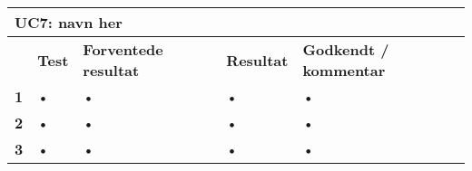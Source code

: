 
\begin{longtable}{|p{5mm}|p{40mm}|p{40mm}|p{20mm}|p{25mm}|}
\hline 
\multicolumn{5}{|l|}{\textbf{UC7: navn her}} \\ 
\hline 
& \textbf{Test} & \textbf{Forventede resultat} & \textbf{Resultat} & \textbf{Godkendt / kommentar} \\ 
\hline 
\textbf{1}& • & • & • & • \\ 
\hline 
\textbf{2}& • & • & • & • \\ 
\hline 
\textbf{3}& • & • & • & • \\ 
\hline 
\end{longtable} 